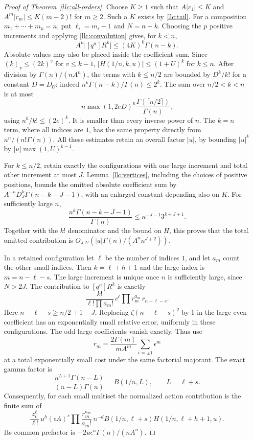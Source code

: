 \begin{proof}[Proof of Theorem~\ref{llc:all-orders}]
Choose $K\ge1$ such that $A|r_1|\le K$ and
$A^m|r_m|\le K(m-2)!$ for $m\ge2$. Such a $K$ exists by
\eqref{llc:tail}. For a composition $m_1+\cdots+m_k=n$, put
$\ell_i=m_i-1$ and $N=n-k$. Choosing the $p$ positive increments
and applying \eqref{llc:convolution} gives, for $k<n$,
\begin{equation}\label{llc:global-bound}
 A^n\bigl|[q^n]R^k\bigr|\le(4K)^k\Gamma(n-k).
\end{equation}
Absolute values may also be placed inside the coefficient sum.
Since $(k)_v\le(2k)^v$ for $v\le k-1$,
$|H(1/n,k,u)|\le(1+U)^k$ for $k\le n$.
After division by $\Gamma(n)/(nA^n)$, the terms with
$k\le n/2$ are bounded by $D^k/k!$ for a constant $D=D_U$:
indeed $n^k\Gamma(n-k)/\Gamma(n)\le2^k$.
The sum over $n/2<k<n$ is at most
\[
 n\max(1,2eD)^n\frac{\Gamma(\lceil n/2\rceil)}{\Gamma(n)},
\]
using $n^k/k!\le(2e)^k$. It is smaller than every inverse power
of $n$. The $k=n$ term, where all indices are $1$, has the same
property directly from $n^n/(n!\Gamma(n))$. All these estimates
retain an overall factor $|u|$, by bounding $|u|^k$ by
$|u|\max(1,U)^{k-1}$.

For $k\le n/2$, retain exactly the configurations with one large
increment and total other increment at most $J$. Lemma~\ref{llc:vertices},
including the choices of positive positions, bounds the omitted
absolute coefficient sum by
$A^{-n}D_{J}^k\Gamma(n-k-J-1)$, with an enlarged constant depending
also on $K$. For sufficiently large $n$,
\[
 \frac{n^k\Gamma(n-k-J-1)}{\Gamma(n)}
 \le n^{-J-1}3^{k+J+1}.
\]
Together with the $k!$ denominator and the bound on $H$, this proves
that the total omitted contribution is
$O_{J,U}(|u|\Gamma(n)/(A^n n^{J+2}))$.

In a retained configuration let $\ell$ be the number of indices $1$,
and let $a_m$ count the other small indices. Then
$k=\ell+h+1$ and the large index is $m=n-\ell-s$.
The large increment is unique once $n$ is sufficiently large, since
$N>2J$. The contribution to $[q^n]R^k$ is exactly
\[
 \frac{k!}{\ell!\prod a_m!}\,
 c^\ell\prod r_m^{a_m}\,r_{n-\ell-s}.
\]
Here $n-\ell-s\ge n/2+1-J$. Replacing $\zeta(n-\ell-s)^2$
by $1$ in the large even coefficient has an exponentially small
relative error, uniformly in these configurations. The odd large
coefficients vanish exactly. Thus use
\[
 r_m=\frac{2\Gamma(m)}{mA^m}\sum_{\epsilon=\pm1}\epsilon^m
\]
at a total exponentially small cost under the same factorial majorant.
The exact gamma factor is
\begin{equation}\label{llc:gamma-product}
 \frac{n^{L+1}\Gamma(n-L)}{(n-L)\Gamma(n)}=B(1/n,L),
 \qquad L=\ell+s.
\end{equation}
Consequently, for each small multiset the normalized action contribution
is the finite sum of
\[
 \frac{z_\epsilon^\ell}{\ell!}\,
 u^h(\epsilon A)^s\prod\frac{r_m^{a_m}}{a_m!}\,
 n^{-d}B(1/n,\ell+s)H(1/n,\ell+h+1,u).
\]
Its common prefactor is $-2u\epsilon^n\Gamma(n)/(nA^n)$.


\end{proof}

